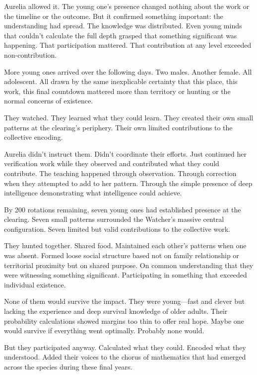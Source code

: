 Aurelia allowed it. The young one's presence changed nothing about the work or the timeline or the outcome. But it confirmed something important: the understanding had spread. The knowledge was distributed. Even young minds that couldn't calculate the full depth grasped that something significant was happening. That participation mattered. That contribution at any level exceeded non-contribution.

\scenebreak

More young ones arrived over the following days. Two males. Another female. All adolescent. All drawn by the same inexplicable certainty that this place, this work, this final countdown mattered more than territory or hunting or the normal concerns of existence.

They watched. They learned what they could learn. They created their own small patterns at the clearing's periphery. Their own limited contributions to the collective encoding.

Aurelia didn't instruct them. Didn't coordinate their efforts. Just continued her verification work while they observed and contributed what they could contribute. The teaching happened through observation. Through correction when they attempted to add to her pattern. Through the simple presence of deep intelligence demonstrating what intelligence could achieve.

By 200 rotations remaining, seven young ones had established presence at the clearing. Seven small patterns surrounded the Watcher's massive central configuration. Seven limited but valid contributions to the collective work.

They hunted together. Shared food. Maintained each other's patterns when one was absent. Formed loose social structure based not on family relationship or territorial proximity but on shared purpose. On common understanding that they were witnessing something significant. Participating in something that exceeded individual existence.

None of them would survive the impact. They were young—fast and clever but lacking the experience and deep survival knowledge of older adults. Their probability calculations showed margins too thin to offer real hope. Maybe one would survive if everything went optimally. Probably none would.

But they participated anyway. Calculated what they could. Encoded what they understood. Added their voices to the chorus of mathematics that had emerged across the species during these final years.

